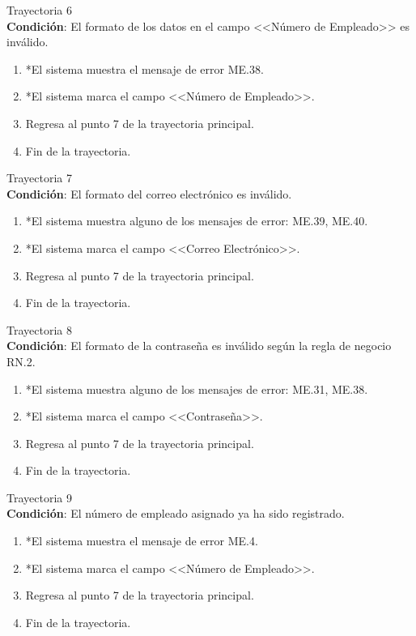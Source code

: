 \large{Trayectoria 6}\\
\textbf{Condición}: El formato de los datos en el campo <<Número de Empleado>> es inválido.
\begin{enumerate}
	\item *El sistema muestra el mensaje de error ME.38.
	\item *El sistema marca el campo <<Número de Empleado>>.
	\item Regresa al punto 7 de la trayectoria principal.
	\item Fin de la trayectoria.
\end{enumerate}
\large{Trayectoria 7}\\
\textbf{Condición}: El formato del correo electrónico es inválido.
\begin{enumerate}
	\item *El sistema muestra alguno de los mensajes de error: ME.39, ME.40.
	\item *El sistema marca el campo <<Correo Electrónico>>.
	\item Regresa al punto 7 de la trayectoria principal.
	\item Fin de la trayectoria.
\end{enumerate}
\large{Trayectoria 8}\\
\textbf{Condición}: El formato de la contraseña es inválido según la regla de negocio RN.2.
\begin{enumerate}
	\item *El sistema muestra alguno de los mensajes de error: ME.31, ME.38.
	\item *El sistema marca el campo <<Contraseña>>.
	\item Regresa al punto 7 de la trayectoria principal.
	\item Fin de la trayectoria.
\end{enumerate}
\large{Trayectoria 9}\\
\textbf{Condición}: El número de empleado asignado ya ha sido registrado.
\begin{enumerate}
	\item *El sistema muestra el mensaje de error ME.4.
	\item *El sistema marca el campo <<Número de Empleado>>.
	\item Regresa al punto 7 de la trayectoria principal.
	\item Fin de la trayectoria.
\end{enumerate}